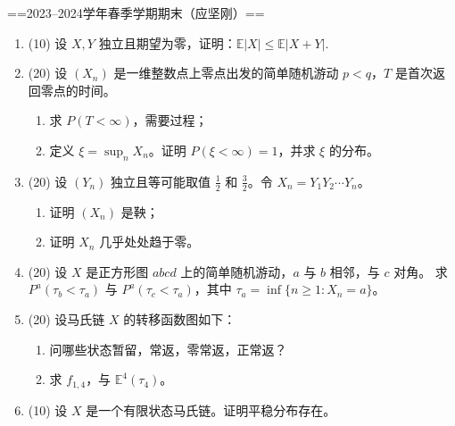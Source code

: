 ==2023--2024学年春季学期期末（应坚刚）==
\begin{enumerate}
    \item (10)
    设 \( X, Y \) 独立且期望为零，证明：\( \mathbb{E}|X| \leqslant \mathbb{E}|X+Y| \).
    \item (20)
    设 \( (X_n) \) 是一维整数点上零点出发的简单随机游动 \( p < q \)，\( T \) 是首次返回零点的时间。
    \begin{enumerate}[label=(\arabic*)]
        \item 求 \( P(T < \infty) \)，需要过程；
        \item 定义 \( \xi = \sup_n X_n \)。证明 \( P(\xi < \infty) = 1 \)，并求 \( \xi \) 的分布。
    \end{enumerate}
    \item (20)
    设 \( (Y_n) \) 独立且等可能取值 \( \frac{1}{2} \) 和 \( \frac{3}{2} \)。令 \( X_n = Y_1 Y_2 \cdots Y_n \)。
    \begin{enumerate}[label=(\arabic*)]
        \item 证明 \( (X_n) \) 是鞅；
        \item 证明 \( X_n \) 几乎处处趋于零。
    \end{enumerate}
    \item (20)
    设 \( X \) 是正方形图 \( abcd \) 上的简单随机游动，\( a \) 与 \( b \) 相邻，与 \( c \) 对角。
    求 \( P^a(\tau_b < \tau_a) \) 与 \( P^a(\tau_c < \tau_a) \)，其中 \( \tau_a = \inf\{n \geqslant 1: X_n = a\} \)。
    \item (20)
    设马氏链 \( X \) 的转移函数图如下：
        \begin{enumerate}[label=(\arabic*)]
            \item 问哪些状态暂留，常返，零常返，正常返？
            \item 求 \( f_{1,4} \)，与 \( \mathbb{E}^4(\tau_4) \)。
        \end{enumerate}
    \item (10)
    设 \( X \) 是一个有限状态马氏链。证明平稳分布存在。
\end{enumerate}